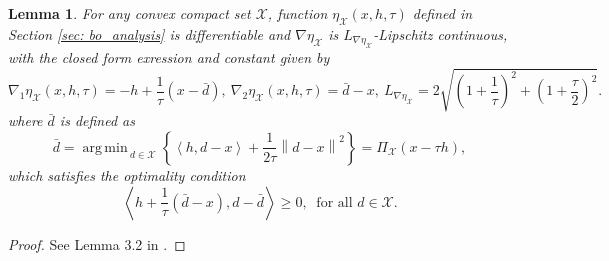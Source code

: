 \documentclass[10pt]{article}
\newtheorem{lemma}{Lemma}[section]
\theoremstyle{remark}
\newcommand{\cX}{\mathcal{X}}
\newcommand{\norm}[1]{\left\|#1\right\|}
\DeclareMathOperator*{\argmin}{arg\,min\,}
\def\<#1,#2>{\left\langle #1,#2\right\rangle}
\begin{document}
\begin{lemma}\label{lem: eta_property}
    For any convex compact set $\cX$, function $\eta_{\cX}(x,h,\tau)$ defined in Section \ref{sec: bo_analysis} is differentiable 
    and $\nabla \eta_{\cX}$ is $L_{\nabla\eta_{\cX}}$-Lipschitz continuous, with the closed form exression and constant given by
    \begin{equation*}
        \nabla_1\eta_{\cX}(x,h,\tau) = -h + \frac{1}{\tau}(x - \bar d),\ \nabla_2\eta_{\cX}(x,h,\tau) = \bar d - x,\  L_{\nabla\eta_{\cX}} = 2 \sqrt{\left(1+\frac{1}{\tau} \right)^2 + \left(1 + \frac{\tau}{2}\right)^2}. \label{eq: nabla_eta}
    \end{equation*}
    where $\bar d$ is defined as
    \[
        \bar d = \argmin_{d\in \cX}\left\{\<h, d - x> + \frac{1}{2\tau}\norm{d-x}^2\right\} = \Pi_{\cX}(x - \tau h),
    \]
    which satisfies the optimality condition
    \begin{equation}\label{ineq: eta_opt_condition}
        \<h + \frac{1}{\tau}(\bar d - x), d - \bar d>\geq 0,\ \text{ for all } d\in \cX.
    \end{equation}
\end{lemma}
\begin{proof}
    See Lemma 3.2 in \cite{ghadimi2020single}.
\end{proof}
\end{document}
